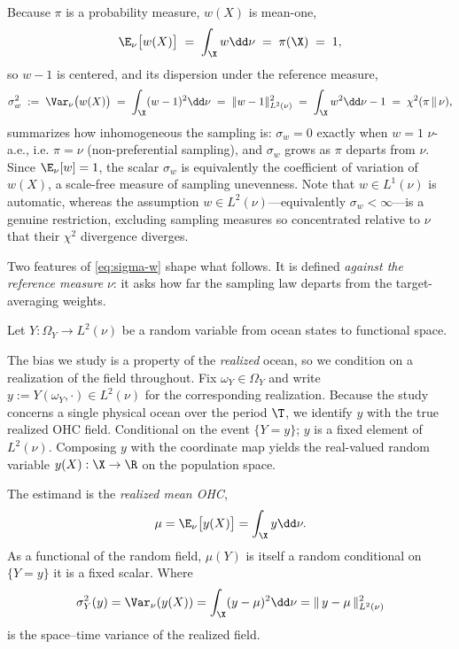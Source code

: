 Because $\pi$ is a probability measure, $w(X)$ is mean-one,
\[
  \E_{\nu}\big[w(X)\big] \;=\; \int_{\X} w \dd\nu \;=\; \pi(\X) \;=\; 1,
\]
so $w-1$ is centered, and its dispersion under the reference measure,
\begin{equation}
  \sigma_w^2 \;:=\; \Var_{\nu}\big(w(X)\big)
  \;=\; \int_{\X} (w-1)^2 \dd\nu
  \;=\; \|w-1\|_{L^2(\nu)}^2
  \;=\; \int_{\X} w^2 \dd\nu - 1
  \;=\; \chi^2(\pi \,\|\, \nu),
  \label{eq:sigma-w}
\end{equation}
summarizes how inhomogeneous the sampling is: $\sigma_w = 0$ exactly when
$w = 1$ $\nu$-a.e., i.e. $\pi = \nu$ (non-preferential sampling), and
$\sigma_w$ grows as $\pi$ departs from $\nu$. Since $\E_\nu[w]=1$, the
scalar $\sigma_w$ is equivalently the coefficient of variation of $w(X)$,
a scale-free measure of sampling unevenness. Note that $w\in L^1(\nu)$ is
automatic, whereas the assumption $w\in L^2(\nu)$---equivalently
$\sigma_w<\infty$---is a genuine restriction, excluding sampling measures
so concentrated relative to $\nu$ that their $\chi^2$ divergence diverges.

Two features of \eqref{eq:sigma-w} shape what follows. It is defined
\emph{against the reference measure} $\nu$: it asks how far the sampling
law departs from the target-averaging weights. 

\begin{definition}
\label{def:Y}
Let $Y: \Omega_Y \to L^2(\nu)$ be a random variable from ocean states to functional space.
\end{definition}

The bias we study is a property of the \emph{realized} ocean, so we condition on a realization of the field throughout.
Fix $\omega_Y\in\Omega_Y$ and write $y := Y(\omega_Y,\cdot)\in L^2(\nu)$ for the corresponding realization.
Because the study concerns a single physical ocean over the period $\T$, we identify $y$ with the true realized OHC field.
Conditional on the event $\{Y = y\}$; $y$ is a fixed element of $L^2(\nu)$.
Composing $y$ with the coordinate map yields the real-valued random variable $y(X): \X \to \R$ on the population space.

\begin{definition}[Estimand]
\label{def:mu}
The estimand is the \emph{realized mean OHC}, 
\[
  \mu = \E_\nu\big[y(X)\big] = \int_\X y \dd\nu.
\]
As a functional of the random field, $\mu(Y)$ is itself a random conditional on $\{Y=y\}$ it is a fixed scalar. 
Where
\[
  \sigma^2_Y(y) = \Var_{\nu}(y(X)) = \int_{\X}(y - \mu)^2\dd\nu = \|\,y - \mu\,\|^2_{L^2(\nu)}
\]
is the space--time variance of the realized field.
\end{definition}

